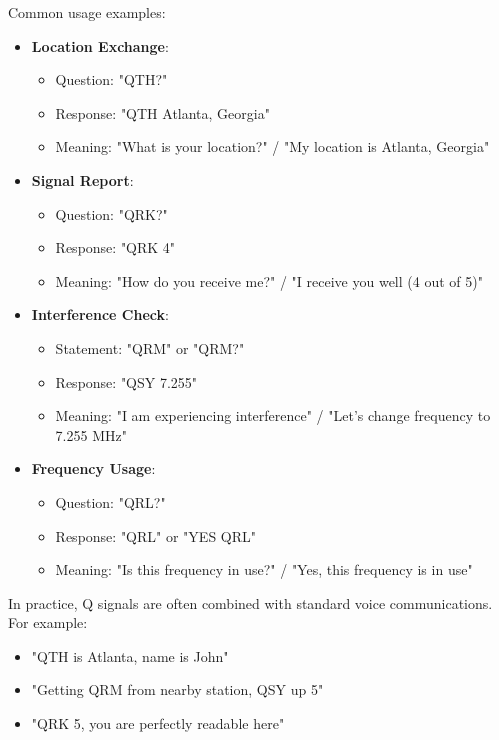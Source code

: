 Common usage examples:
\begin{itemize}
    \item \textbf{Location Exchange}:
        \begin{itemize}
            \item Question: "QTH?"
            \item Response: "QTH Atlanta, Georgia"
            \item Meaning: "What is your location?" / "My location is Atlanta, Georgia"
        \end{itemize}
    \item \textbf{Signal Report}:
        \begin{itemize}
            \item Question: "QRK?"
            \item Response: "QRK 4"
            \item Meaning: "How do you receive me?" / "I receive you well (4 out of 5)"
        \end{itemize}
    \item \textbf{Interference Check}:
        \begin{itemize}
            \item Statement: "QRM" or "QRM?"
            \item Response: "QSY 7.255"
            \item Meaning: "I am experiencing interference" / "Let's change frequency to 7.255 MHz"
        \end{itemize}
    \item \textbf{Frequency Usage}:
        \begin{itemize}
            \item Question: "QRL?"
            \item Response: "QRL" or "YES QRL"
            \item Meaning: "Is this frequency in use?" / "Yes, this frequency is in use"
        \end{itemize}
\end{itemize}

In practice, Q signals are often combined with standard voice communications. For example:
\begin{itemize}
    \item "QTH is Atlanta, name is John"
    \item "Getting QRM from nearby station, QSY up 5"
    \item "QRK 5, you are perfectly readable here"
\end{itemize}

